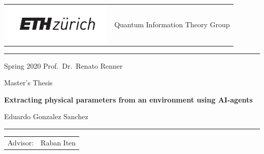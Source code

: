 \documentclass[11pt,a4paper,twoside]{report}
\newcommand{\+}{\textnormal{+} }
\theoremstyle{definition}
\numberwithin{equation}{chapter}
\begin{document}
\begin{titlepage}
  \mbox{}

  \vspace{-1.5cm}
  \noindent
  \begin{tabular}{@{} l @{} l @{}}
    \begin{minipage}[c]{0.5\textwidth}
      \hspace{-4mm}
      \includegraphics[height=19mm]{figures/eth_logo.pdf}
    \end{minipage} &
    \begin{minipage}[c]{0.5\textwidth}
       \hfill \large Quantum Information Theory Group
    \end{minipage} \\
  \end{tabular}
  \rule{\textwidth}{0.5pt}
  \begin{center}
    {\Large 
      Spring 2020 \hfill Prof.~Dr.~Renato Renner
    }
    
    \LARGE
    Master's Thesis
 
    \Huge\textbf{Extracting physical parameters from an environment using AI-agents}
    
    \LARGE{
      Eduardo Gonzalez Sanchez
    }
    
    \rule{\textwidth}{0.5pt}
   
    \vspace{0.0cm}
    \begin{flushleft}
      \begin{tabular}{ll}
        \Large Advisor: & \Large 
        Raban Iten
      \end{tabular}
    \end{flushleft}
  \end{center}
\end{titlepage}
%

\thispagestyle{plain}
\cleardoublepage
\end{document}
